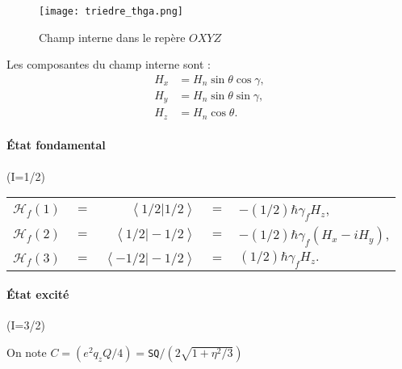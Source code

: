 \begin{figure}[!h]
\centering
\texttt{[image: triedre\_thga.png]}
\caption{\label{fig:theta_gamma} Champ interne dans le repère $OXYZ$}
\end{figure}

Les composantes du champ interne sont :
\begin{align*}
  H_x &= H_n \sin \theta \cos \gamma,\\
  H_y &= H_n \sin \theta \sin \gamma,\\
  H_z &= H_n \cos\theta.
\end{align*}

\paragraph{\'Etat fondamental}(I=1/2)

\begin{tabular}{ccrcl}
$\mathcal{H}_f(1)$&$=$&    $\left\langle 1/2 \big\vert 1/2 \right\rangle$ &$=$& $\displaystyle-(1/2)\hbar \gamma_f H_z$, \\
$\mathcal{H}_f(2)$  &$=$&$\left\langle 1/2 \big\vert -1/2 \right\rangle$ &$=$&$\displaystyle -(1/2)\hbar \gamma_f \left(H_x -i H_y\right)$, \\
$\mathcal{H}_f(3)$  &$=$&$\left\langle -1/2 \big\vert -1/2 \right\rangle$ &$=$& $\displaystyle(1/2)\hbar \gamma_f H_z.$ \\
\end{tabular}

\paragraph{\'Etat excité}(I=3/2)

 On note $C=(e^2 q_z Q/4) = $\lstinline{SQ}$/(2\sqrt{1+\eta^2/3})$
  
